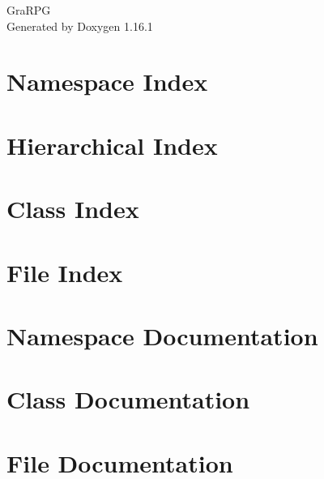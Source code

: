 \documentclass[twoside]{book}
\newcommand{\+}{\discretionary{\mbox{\scriptsize$\hookleftarrow$}}{}{}}
\newcommand{\clearemptydoublepage}{%
    \newpage{\pagestyle{empty}\cleardoublepage}%
  }
\begin{document}
  \raggedbottom
  \begin{titlepage}
  \vspace*{7cm}
  \begin{center}%
  {\Large Gra\+RPG}\\
  \vspace*{1cm}
  {\large Generated by Doxygen 1.16.1}\\
  \end{center}
  \end{titlepage}
  \clearemptydoublepage
  \tableofcontents
  \clearemptydoublepage
\chapter{Namespace Index}

\chapter{Hierarchical Index}

\chapter{Class Index}

\chapter{File Index}

\chapter{Namespace Documentation}

\chapter{Class Documentation}











\chapter{File Documentation}
























  \backmatter
  \newpage
  \clearemptydoublepage
  \printindex
\end{document}
